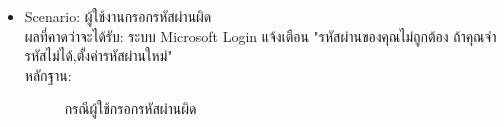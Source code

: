 \documentclass[14pt,oneside,openright,a4paper]{cpe-thai-project}
\begin{document}
\begin{itemize}
  \item Scenario: ผู้ใช้งานกรอกรหัสผ่านผิด
  \\ผลที่คาดว่าจะได้รับ: ระบบ Microsoft Login แจ้งเตือน "รหัสผ่านของคุณไม่ถูกต้อง ถ้าคุณจำรหัสไม่ได้,ตั้งค่ารหัสผ่านใหม่"
  \\หลักฐาน:\\
  \begin{figure}[!h]\centering
    \setlength{\fboxrule}{0.5mm} %
    \setlength{\fboxsep}{0.5cm}
    \caption{กรณีผู้ใช้กรอกรหัสผ่านผิด}\label{fig:LoginPageTest}
  \end{figure}
\end{itemize}

\newpage
\end{document}
